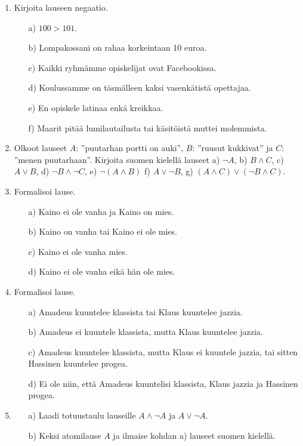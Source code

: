\begin{enumerate}

\item  Kirjoita lauseen negaatio.
\begin{itemize}
\item[a)] $100 > 101$.
\item[b)] Lompakossani on rahaa korkeintaan 10 euroa.
\item[c)] Kaikki ryhmämme opiskelijat ovat Facebookissa.
\item[d)] Koulussamme on täsmälleen kaksi vasenkätistä opettajaa.
\item[e)] En opiskele latinaa enkä kreikkaa.
\item[f)] Maarit pitää lumilautailusta tai käsitöistä muttei molemmista.
\end{itemize}

\item Olkoot lauseet $A$: ''puutarhan portti on auki'', $B$: ''ruusut kukkivat'' ja $C$: ''menen puutarhaan''. Kirjoita suomen kielellä lauseet a) $\lnot A$,  b)  $B\land C$,  c)  $A\lor B$,
d) $\lnot B \land \lnot C$,  e)  $\lnot(A\land B)$  f)  $A \lor \lnot B$,   g)  $(A \land C) \lor (\lnot B \land C)$. 

\item Formalisoi lause.
\begin{itemize}
\item[a)] Kaino ei ole vanha ja Kaino on mies.
\item[b)] Kaino on vanha tai Kaino ei ole mies.
\item[c)] Kaino ei ole vanha mies. 
\item[d)] Kaino ei ole vanha eikä hän ole mies.
\end{itemize}

\item Formalisoi lause.
\begin{itemize}
\item[a)] Amadeus kuuntelee klassista tai Klaus kuuntelee jazzia.
\item[b)] Amadeus ei kuuntele klassista, mutta Klaus kuuntelee jazzia.
\item[c)] Amadeus kuuntelee klassista, mutta Klaus ei kuuntele jazzia, tai sitten Hassinen kuuntelee progea.
\item[d)] Ei ole niin, että Amadeus kuuntelisi klassista, Klaus jazzia ja Hassinen progea.
\end{itemize}

\item 
\begin{itemize}
\item[a)] Laadi totuustaulu lauseille $A\land \lnot A$ ja $A\lor \lnot A$.
\item[b)] Keksi atomilause $A$ ja ilmaise kohdan a) lauseet suomen kielellä.
\end{itemize}


\end{enumerate}
